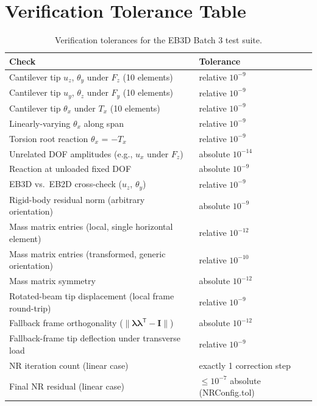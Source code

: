 \documentclass[11pt,a4paper]{article}
\newcommand{\bmath}[1]{\boldsymbol{#1}}
\begin{document}
\section{Verification Tolerance Table}

\begin{table}[h!]
\centering
\small
\begin{tabular}{l l}
\toprule
Check & Tolerance \\
\midrule
Cantilever tip $u_z$, $\theta_y$ under $F_z$ (10 elements) & relative $10^{-9}$ \\
Cantilever tip $u_y$, $\theta_z$ under $F_y$ (10 elements) & relative $10^{-9}$ \\
Cantilever tip $\theta_x$ under $T_x$ (10 elements)       & relative $10^{-9}$ \\
Linearly-varying $\theta_x$ along span                   & relative $10^{-9}$ \\
Torsion root reaction $\theta_x$ = $-T_x$                 & relative $10^{-9}$ \\
Unrelated DOF amplitudes (e.g., $u_x$ under $F_z$)        & absolute $10^{-14}$ \\
Reaction at unloaded fixed DOF                            & absolute $10^{-9}$ \\
EB3D vs.\ EB2D cross-check ($u_z$, $\theta_y$)            & relative $10^{-9}$ \\
Rigid-body residual norm (arbitrary orientation)          & absolute $10^{-9}$ \\
Mass matrix entries (local, single horizontal element)    & relative $10^{-12}$ \\
Mass matrix entries (transformed, generic orientation)    & relative $10^{-10}$ \\
Mass matrix symmetry                                       & absolute $10^{-12}$ \\
Rotated-beam tip displacement (local frame round-trip)    & relative $10^{-9}$ \\
Fallback frame orthogonality ($\|\bmath{\lambda}\bmath{\lambda}^\mathsf{T} - \bmath{I}\|$) & absolute $10^{-12}$ \\
Fallback-frame tip deflection under transverse load        & relative $10^{-9}$ \\
NR iteration count (linear case)                          & exactly 1 correction step \\
Final NR residual (linear case)                           & $\le 10^{-7}$ absolute (NRConfig.tol) \\
\bottomrule
\end{tabular}
\caption{Verification tolerances for the EB3D Batch 3 test suite.}
\end{table}
\end{document}
